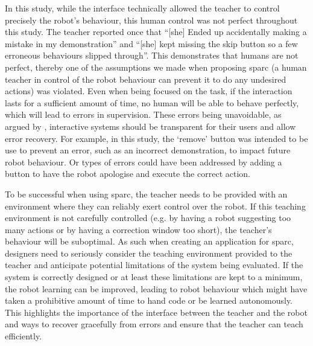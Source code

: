 In this study, while the interface technically allowed the teacher to control precisely the robot's behaviour, this human control was not perfect throughout this study. %
The teacher reported once that ``[she] Ended up accidentally making a mistake in my demonstration'' and ``[she] kept missing the skip button so a few erroneous behaviours slipped through''. This demonstrates that humans are not perfect, thereby one of the assumptions we made when proposing \gls{sparc} (a human teacher in control of the robot behaviour can prevent it to do any undesired actions) was violated. Even when being focused on the task, if the interaction lasts for a sufficient amount of time, no human will be able to behave perfectly, which will lead to errors in supervision. These errors being unavoidable, as argued by \cite{rasmussen1989coping}, interactive systems should be transparent for their users and allow error recovery. For example, in this study, the `remove' button was intended to be use to prevent an error, such as an incorrect demonstration, to impact future robot behaviour. Or types of errors could have been addressed by adding a button to have the robot apologise and execute the correct action.


To be successful when using \gls{sparc}, the teacher needs to be provided with an environment where they can reliably exert control over the robot. If this teaching environment is not carefully controlled (e.g. by having a robot suggesting too many actions or by having a correction window too short), the teacher's behaviour will be suboptimal. As such when creating an application for \gls{sparc}, designers need to seriously consider the teaching environment provided to the teacher and anticipate potential limitations of the system being evaluated. If the system is correctly designed or at least these limitations are kept to a minimum, the robot learning can be improved, leading to robot behaviour which might have taken a prohibitive amount of time to hand code or be learned autonomously. This highlights the importance of the interface between the teacher and the robot and ways to recover gracefully from errors and ensure that the teacher can teach efficiently. 

